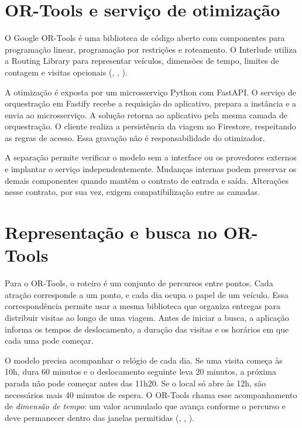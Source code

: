 \section{OR-Tools e serviço de otimização}

O Google OR-Tools é uma biblioteca de código aberto com componentes para programação linear, programação por restrições e roteamento. O Interlude utiliza a Routing Library para representar veículos, dimensões de tempo, limites de contagem e visitas opcionais (\citeauthor{google_ortools}, \citeyear{google_ortools}, \citeyear{google_vrptw}).

A otimização é exposta por um microsserviço Python com FastAPI. O serviço de orquestração em Fastify recebe a requisição do aplicativo, prepara a instância e a envia ao microsserviço. A solução retorna ao aplicativo pela mesma camada de orquestração. O cliente realiza a persistência da viagem no Firestore, respeitando as regras de acesso. Essa gravação não é responsabilidade do otimizador.

A separação permite verificar o modelo sem a interface ou os provedores externos e implantar o serviço independentemente. Mudanças internas podem preservar os demais componentes quando mantêm o contrato de entrada e saída. Alterações nesse contrato, por sua vez, exigem compatibilização entre as camadas.

\section{Representação e busca no OR-Tools}
\label{sec:representacao-busca}

Para o OR-Tools, o roteiro é um conjunto de percursos entre pontos. Cada atração corresponde a um ponto, e cada dia ocupa o papel de um veículo. Essa correspondência permite usar a mesma biblioteca que organiza entregas para distribuir visitas ao longo de uma viagem. Antes de iniciar a busca, a aplicação informa os tempos de deslocamento, a duração das visitas e os horários em que cada uma pode começar.

O modelo precisa acompanhar o relógio de cada dia. Se uma visita começa às 10h, dura 60 minutos e o deslocamento seguinte leva 20 minutos, a próxima parada não pode começar antes das 11h20. Se o local só abre às 12h, são necessários mais 40 minutos de espera. O OR-Tools chama esse acompanhamento de \textit{dimensão de tempo}: um valor acumulado que avança conforme o percurso e deve permanecer dentro das janelas permitidas (\citeauthor{google_dimensions}, \citeyear{google_dimensions}, \citeyear{google_vrptw}).

